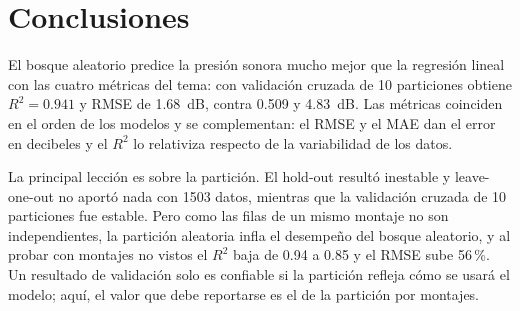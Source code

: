 \documentclass[11pt,letterpaper]{article}
\begin{document}
\section{Conclusiones}

El bosque aleatorio predice la presión sonora mucho mejor que la regresión lineal con las cuatro métricas del tema: con validación cruzada de 10 particiones obtiene $R^2 = 0.941$ y RMSE de 1.68~dB, contra 0.509 y 4.83~dB. Las métricas coinciden en el orden de los modelos y se complementan: el RMSE y el MAE dan el error en decibeles y el $R^2$ lo relativiza respecto de la variabilidad de los datos.

La principal lección es sobre la partición. El hold-out resultó inestable y leave-one-out no aportó nada con 1503 datos, mientras que la validación cruzada de 10 particiones fue estable. Pero como las filas de un mismo montaje no son independientes, la partición aleatoria infla el desempeño del bosque aleatorio, y al probar con montajes no vistos el $R^2$ baja de 0.94 a 0.85 y el RMSE sube 56\,\%. Un resultado de validación solo es confiable si la partición refleja cómo se usará el modelo; aquí, el valor que debe reportarse es el de la partición por montajes.

\end{document}

